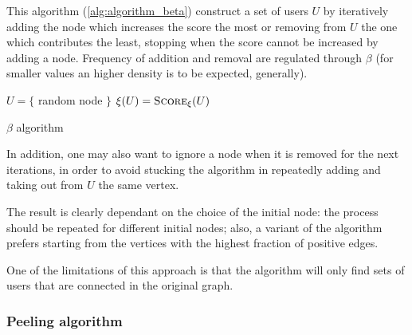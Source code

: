 This algorithm (\autoref{alg:algorithm_beta}) construct a set of users $U$ by
iteratively adding the node which increases the score the most or removing from
$U$ the one which contributes the least, stopping when the score cannot be
increased by adding a node. Frequency of addition and removal are regulated
through $\beta $ (for smaller values an higher density is to be expected,
generally).

\begin{algorithm}
	\SetAlgoLined
	$U = \{$ random node $\}$\;
	$\xi(U) = \textsc{Score}_{\xi}(U)$ \;
	\caption{$\beta$ algorithm}
	\label{alg:algorithm_beta}
\end{algorithm}

In addition, one may also want to ignore a node when it is removed for the
next iterations, in order to avoid stucking the algorithm in repeatedly adding
and taking out from $U$ the same vertex.

The result is clearly dependant on the choice of the initial node: the process
should be repeated for different initial nodes; also, a variant
of the algorithm prefers starting from the vertices with the highest fraction of positive edges.

One of the limitations of this approach is that the algorithm will only find
sets of users that are connected in the original graph.

\subsubsection{Peeling algorithm}%
\label{ssub:peeling_algorithm}

